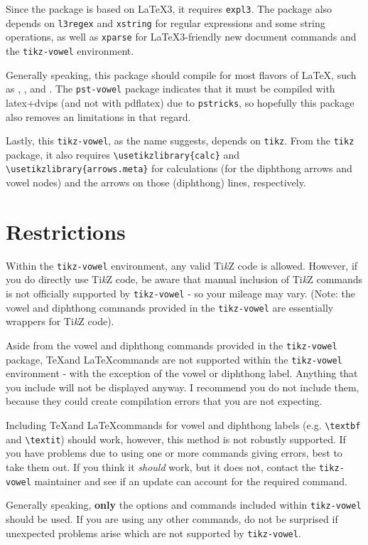 \documentclass{article}
\newcommand{\pdfLaTeX}{\hologo{pdfLaTeX}\xspace}
\newcommand{\TikZ}{Ti\textit{k}Z\xspace}
\newcommand{\pkg}[1]{\texttt{#1}}
\begin{document}
Since the package is based on \LaTeX3, it requires \pkg{expl3}.  The package also depends on \pkg{l3regex} and \pkg{xstring} for regular expressions and some string operations, as well as \pkg{xparse} for \LaTeX3-friendly new document commands and the \verb|tikz-vowel| environment.

Generally speaking, this package should compile for most flavors of \LaTeX, such as \pdfLaTeX, \LuaLaTeX, and \XeLaTeX.  The \pkg{pst-vowel} package indicates that it must be compiled with latex+dvips (and not with pdflatex) due to \pkg{pstricks}, so hopefully this package also removes an limitations in that regard.

Lastly, this \pkg{tikz-vowel}, as the name suggests, depends on \pkg{tikz}.  From the \pkg{tikz} package, it also requires \verb|\usetikzlibrary{calc}| and \verb|\usetikzlibrary{arrows.meta}| for calculations (for the diphthong arrows and vowel nodes) and the arrows on those (diphthong) lines, respectively.


\section{Restrictions}
\label{sec:Restrictions}

Within the \verb|tikz-vowel| environment, any valid \TikZ code is allowed.  However, if you do directly use \TikZ code, be aware that manual inclusion of \TikZ commands is not officially supported by \pkg{tikz-vowel} - so your mileage may vary.  (Note: the vowel and diphthong commands provided in the \pkg{tikz-vowel} are essentially wrappers for \TikZ code).

Aside from the vowel and diphthong commands provided in the \pkg{tikz-vowel} package, \TeX and \LaTeX commands are not supported within the \verb|tikz-vowel| environment - with the exception of the vowel or diphthong label.  Anything that you include will not be displayed anyway.  I recommend you do not include them, because they could create compilation errors that you are not expecting.

Including \TeX and \LaTeX commands for vowel and diphthong labels (e.g. \verb|\textbf| and \verb|\textit|) should work, however, this method is not robustly supported.  If you have problems due to using one or more commands giving errors, best to take them out.  If you think it \textit{should} work, but it does not, contact the \pkg{tikz-vowel} maintainer and see if an update can account for the required command.

Generally speaking, \textbf{only} the options and commands included within \pkg{tikz-vowel} should be used.  If you are using any other commands, do not be surprised if unexpected problems arise which are not supported by \pkg{tikz-vowel}.
\end{document}
